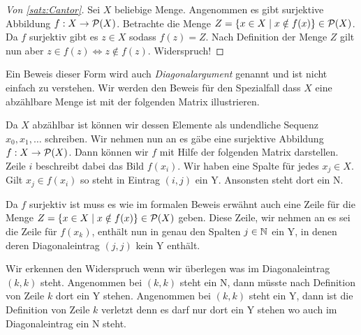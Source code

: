 \begin{proof}[Von \autoref{satz:Cantor}]
Sei $X$ beliebige Menge. 
Angenommen es gibt surjektive Abbildung $f:X\rightarrow\mathcal{P}(X)$.
Betrachte die Menge $Z=\{x\in X\mid x\notin f(x)\}\in\mathcal{P}(X)$.
Da $f$ surjektiv gibt es $z\in X$ sodass $f(z)=Z$.
Nach Definition der Menge $Z$ gilt nun aber $z\in f(z)\Leftrightarrow z\notin f(z)$. Widerspruch!
\end{proof}

Ein Beweis dieser Form wird auch \emph{Diagonalargument} genannt und ist nicht einfach zu verstehen.
Wir werden den Beweis für den Spezialfall dass $X$ eine abzählbare Menge ist mit der folgenden Matrix illustrieren.

Da $X$ abzählbar ist können wir dessen Elemente als undendliche Sequenz $x_0,x_1,\ldots$ schreiben.
Wir nehmen nun an es gäbe eine surjektive Abbildung $f:X\rightarrow\mathcal{P}(X)$.
Dann können wir $f$ mit Hilfe der folgenden Matrix darstellen.
Zeile $i$ beschreibt dabei das Bild $f(x_i)$. 
Wir haben eine Spalte für jedes $x_j\in X$.
Gilt $x_j\in f(x_i)$ so steht in Eintrag $(i,j)$ ein Y. Ansonsten steht dort ein N.

Da $f$ surjektiv ist muss es wie im formalen Beweis erwähnt auch eine Zeile für die Menge $Z=\{x\in X\mid x\notin f(x)\}\in\mathcal{P}(X)$ geben.
Diese Zeile, wir nehmen an es sei die Zeile für $f(x_k)$, enthält nun in genau den Spalten $j\in\mathbb{N}$ ein Y, in denen deren Diagonaleintrag $(j, j)$ kein Y enthält.

Wir erkennen den Widerspruch wenn wir überlegen was im Diagonaleintrag $(k, k)$ steht.
Angenommen bei $(k, k)$ steht ein N, dann müsste nach Definition von Zeile $k$ dort ein Y stehen.
Angenommen bei $(k, k)$ steht ein Y, dann ist die Definition von Zeile $k$ verletzt denn es darf nur dort ein Y stehen wo auch im Diagonaleintrag ein N steht.

